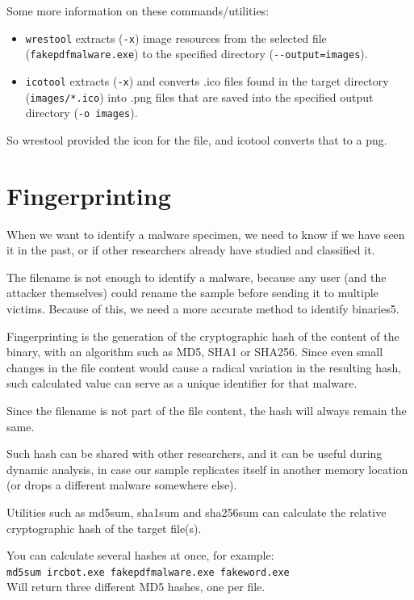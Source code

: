 \documentclass[]{project_plan}
\begin{document}
Some more information on these commands/utilities:
\begin{itemize}
  \item \lstinline|wrestool| extracts (\lstinline|-x|) image resources from the
        selected file (\lstinline|fakepdfmalware.exe|)
        to the specified directory (\lstinline|--output=images|).
  \item \lstinline|icotool| extracts (\lstinline|-x|) and converts .ico files found in the target directory
        (\lstinline|images/*.ico|) into .png files that are saved into the specified output
        directory (\lstinline|-o images|).
\end{itemize}

So wrestool provided the icon for the file, and icotool converts that to a png.

\section{Fingerprinting}

When we want to identify a malware specimen, we need to know if we have
seen it in the past, or if other researchers already have studied and classified
it.

The filename is not enough to identify a malware, because any user (and
the attacker themselves) could rename the sample before sending it to multiple
victims. Because of this, we need a more accurate method to identify binaries5.

Fingerprinting is the generation of the cryptographic hash of the content
of the binary, with an algorithm such as MD5, SHA1 or SHA256. Since even
small changes in the file content would cause a radical variation in the resulting
hash, such calculated value can serve as a unique identifier for that malware.

Since the filename is not part of the file content, the hash will always remain
the same.

Such hash can be shared with other researchers, and it can be useful during
dynamic analysis, in case our sample replicates itself in another memory location
(or drops a different malware somewhere else).

Utilities such as md5sum, sha1sum
and sha256sum can calculate the relative cryptographic hash of the target file(s).

You can calculate several hashes at once, for example:\\
\lstinline|md5sum ircbot.exe fakepdfmalware.exe fakeword.exe|\\
Will return three different MD5 hashes, one per file.
\end{document}
